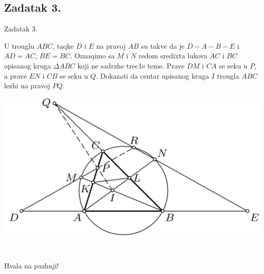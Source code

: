 \documentclass{beamer}
\begin{document}
\subsection{Zadatak 3.}
\begin{frame}{Zadatak 3.}
\begin{block}{}
U trouglu $ABC$, taqke $D$ i $E$ na pravoj $AB$ su takve da je $D-A-B-E$ i $AD = AC$,
$BE = BC$. Oznaqimo sa $M$ i $N$ redom sredixta lukova $AC$ i $BC$ opisanog kruga
$\Delta ABC$ koji ne sadrzhe trec1e teme. Prave $DM$ i $CA$ se seku u $P$, a prave $EN$ i $CB$
se seku u $Q$. Dokazati da centar upisanog kruga $I$ trougla $ABC$ lezhi na pravoj $PQ$.
\end{block}
\centering \includegraphics[scale=0.2]{Paskal3}
\end{frame}

\section{}
\begin{frame}
 \centering\LARGE   Hvala na pazhnji!
\end{frame}
\end{document}
